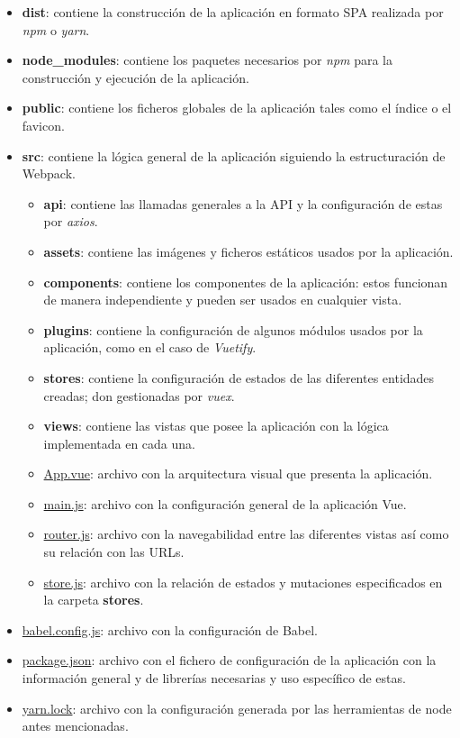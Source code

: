 \begin{itemize}
    \item \textbf{dist}: contiene la construcción de la aplicación en formato SPA realizada por \textit{npm} o \textit{yarn}.
    \item \textbf{node\_modules}: contiene los paquetes necesarios por \textit{npm} para la construcción y ejecución de la aplicación.
    \item \textbf{public}: contiene los ficheros globales de la aplicación tales como el índice o el favicon.
    \item \textbf{src}: contiene la lógica general de la aplicación siguiendo la estructuración de Webpack.
    \begin{itemize}
        \item \textbf{api}: contiene las llamadas generales a la API y la configuración de estas por \textit{axios}.
        \item \textbf{assets}: contiene las imágenes y ficheros estáticos usados por la aplicación.
        \item \textbf{components}: contiene los componentes de la aplicación: estos funcionan de manera independiente y pueden ser usados en cualquier vista.
        \item \textbf{plugins}: contiene la configuración de algunos módulos usados por la aplicación, como en el caso de \textit{Vuetify}.
        \item \textbf{stores}: contiene la configuración de estados de las diferentes entidades creadas; don gestionadas por \textit{vuex}.
        \item \textbf{views}: contiene las vistas que posee la aplicación con la lógica implementada en cada una.
        \item \underline{App.vue}: archivo con la arquitectura visual que presenta la aplicación.
        \item \underline{main.js}: archivo con la configuración general de la aplicación Vue.
        \item \underline{router.js}: archivo con la navegabilidad entre las diferentes vistas así como su relación con las URLs.
        \item \underline{store.js}: archivo con la relación de estados y mutaciones especificados en la carpeta \textbf{stores}.
    \end{itemize}
    \item \underline{babel.config.js}: archivo con la configuración de Babel.
    \item \underline{package.json}: archivo con el fichero de configuración de la aplicación con la información general y de librerías necesarias y uso específico de estas.
    \item \underline{yarn.lock}: archivo con la configuración generada por las herramientas de node antes mencionadas.
\end{itemize}